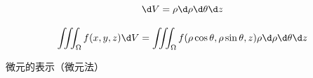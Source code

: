 \begin{center}
	$$\d V=\rho \d\rho \d\theta \d z$$
\end{center}

$${\iiint_{\Omega}f(x,y,z)\d
V=\iiint_{\Omega}f(\rho\cos\theta,\rho\sin\theta,z)\rho 
\d\rho \d\theta \d z}$$

微元的表示（微元法）

\begin{center}
\end{center}

